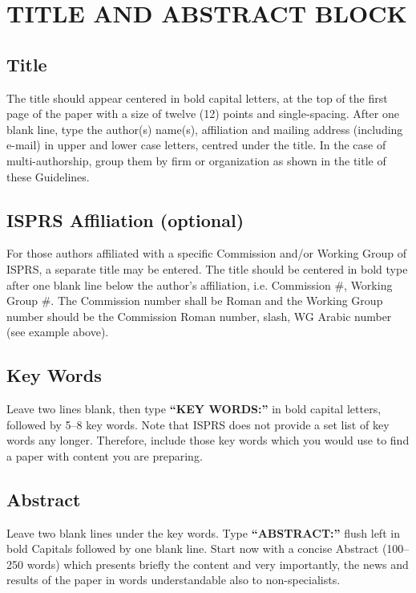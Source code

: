 \documentclass{isprs} %
\begin{document}
\section{TITLE AND ABSTRACT BLOCK}\label{sec:TITLE AND ABSTRACT BLOCK}

\subsection{Title}\label{sec:Title}

The title should appear centered in bold capital letters, at the top of the 
first page of the paper with a size of twelve (12) points and single-spacing. 
After one blank line, type the author(s) name(s), affiliation and mailing address 
(including e-mail) in upper and lower case letters, centred under the title. In the 
case of multi-authorship, group them by firm or organization as shown in the title 
of these Guidelines. 

\subsection{ISPRS Affiliation (optional)}\label{sec:ISPRS Affiliation (optional)}

For those authors affiliated with a specific Commission and/or Working Group of 
ISPRS, a separate title may be entered. The title should be centered in bold type 
after one blank line below the author's affiliation, i.e. Commission \#, Working Group \#. 
The Commission number shall be Roman and the Working Group number should be the Commission 
Roman number, slash, WG Arabic number (see example above).


\subsection{Key Words}\label{sec:Key Words}

Leave two lines blank, then type \textbf{``KEY WORDS:''}
in bold capital letters, followed by 5--8 key words. Note that ISPRS does not provide a set 
list of key words any longer. Therefore, include those key words which you would 
use to find a paper with content you are preparing.


\subsection{Abstract}\label{sec:Abstract}

Leave two blank lines under the key words. Type \textbf{``ABSTRACT:''}
flush left in bold Capitals followed by one blank line. Start now
with a concise Abstract (100--250 words) which presents briefly the
content and very importantly, the news and results of the paper in
words understandable also to non-specialists. 
\end{document}
